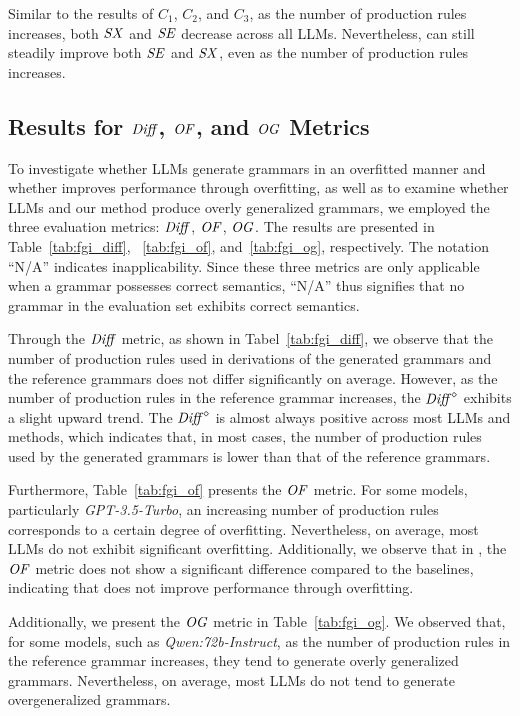 Similar to the results of $C_1$, $C_2$, and $C_3$, as the number of production rules increases, both $\mathit{SX}$ and $\mathit{SE}$ decrease across all LLMs. Nevertheless, \NAME can still steadily improve both $\mathit{SE}$ and $\mathit{SX}$, even as the number of production rules increases.

\subsection{Results for ${\mathit{Diff}}$, $\mathit{OF}$, and $\mathit{OG}$ Metrics}
\label{appendix:fgi_results}
To investigate whether LLMs generate grammars in an overfitted manner and whether \NAME improves performance through overfitting, as well as to examine whether LLMs and our method produce overly generalized grammars, we employed the three evaluation metrics: ${\mathit{Diff}}$, $\mathit{OF}$, $\mathit{OG}$. The results are presented in Table~\ref{tab:fgi_diff}, ~\ref{tab:fgi_of}, and~\ref{tab:fgi_og}, respectively. The notation “N/A” indicates inapplicability. Since these three metrics are only applicable when a grammar possesses correct semantics, “N/A” thus signifies that no grammar in the evaluation set exhibits correct semantics.

Through the ${\mathit{Diff}}$ metric, as shown in Tabel~\ref{tab:fgi_diff}, we observe that the number of production rules used in derivations of the generated grammars and the reference grammars does not differ significantly on average. However, as the number of production rules in the reference grammar increases, the ${\mathit{Diff}}^\diamond$ exhibits a slight upward trend. The ${\mathit{Diff}}^\diamond$ is almost always positive across most LLMs and methods, which indicates that, in most cases, the number of production rules used by the generated grammars is lower than that of the reference grammars.

Furthermore, Table~\ref{tab:fgi_of} presents the $\mathit{OF}$ metric. For some models, particularly \textit{GPT-3.5-Turbo}, an increasing number of production rules corresponds to a certain degree of overfitting. Nevertheless, on average, most LLMs do not exhibit significant overfitting. Additionally, we observe that in \NAME, the $\mathit{OF}$ metric does not show a significant difference compared to the baselines, indicating that \NAME does not improve performance through overfitting.

Additionally, we present the $\mathit{OG}$ metric in Table~\ref{tab:fgi_og}. We observed that, for some models, such as \textit{Qwen:72b-Instruct}, as the number of production rules in the reference grammar increases, they tend to generate overly generalized grammars. Nevertheless, on average, most LLMs do not tend to generate overgeneralized grammars.

